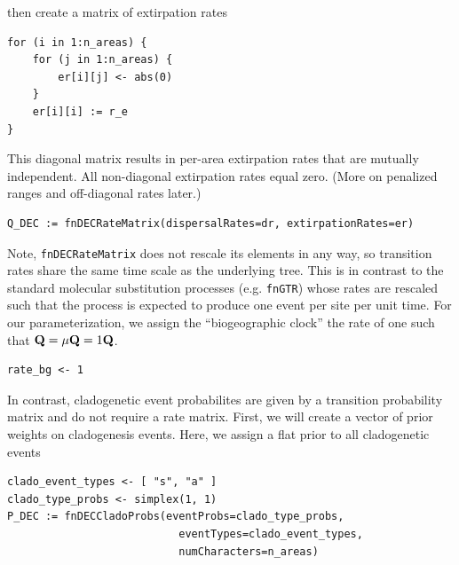 then create a matrix of extirpation rates

\begin{snugshade}
\begin{lstlisting}
for (i in 1:n_areas) {
    for (j in 1:n_areas) {
	    er[i][j] <- abs(0)        
    }
	er[i][i] := r_e
}
\end{lstlisting}
\end{snugshade}

This diagonal matrix results in per-area extirpation rates that are mutually independent.
All non-diagonal extirpation rates equal zero.
(More on penalized ranges and off-diagonal rates later.)

\begin{snugshade}
\begin{lstlisting}
Q_DEC := fnDECRateMatrix(dispersalRates=dr, extirpationRates=er)
\end{lstlisting}
\end{snugshade}

Note, {\tt fnDECRateMatrix} does not rescale its elements in any way, so transition rates share the same time scale as the underlying tree.
This is in contrast to the standard molecular substitution processes (e.g. {\tt fnGTR}) whose rates are rescaled such that the process is expected to produce one event per site per unit time.
For our parameterization, we assign the ``biogeographic clock'' the rate of one such that ${\bf Q} = \mu {\bf Q} = 1 {\bf Q}$.

\begin{snugshade}
\begin{lstlisting}
rate_bg <- 1
\end{lstlisting}
\end{snugshade}

In contrast, cladogenetic event probabilites are given by a transition probability matrix and do not require a rate matrix.
First, we will create a vector of prior weights on cladogenesis events. Here, we assign a flat prior to all cladogenetic events

\begin{snugshade}
\begin{lstlisting}
clado_event_types <- [ "s", "a" ]
clado_type_probs <- simplex(1, 1)
P_DEC := fnDECCladoProbs(eventProbs=clado_type_probs,
                           eventTypes=clado_event_types,
                           numCharacters=n_areas)
\end{lstlisting}
\end{snugshade}

